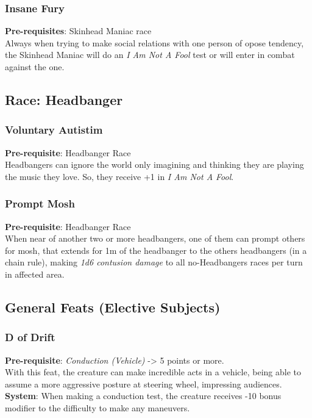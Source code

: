 \documentclass[ letterpaper,12pt]{article}
\begin{document}
\subsubsection{Insane Fury}
 {\bf Pre-requisites}: Skinhead Maniac race\\
 Always when trying to make social relations with one person of opose tendency, the Skinhead Maniac will do an {\it I Am Not A Fool} test or will enter in combat against the one.

\subsection{Race: Headbanger}

\subsubsection{Voluntary Autistim}
{\bf Pre-requisite}: Headbanger Race\\
Headbangers can ignore the world only imagining and thinking they are playing the music they love. So, they receive +1 in {\it I Am Not A Fool}.\\

\subsubsection{Prompt Mosh}
 {\bf Pre-requisite}: Headbanger Race\\
 When near of another two or more headbangers, one of them can prompt others for mosh, that extends for 1m of the headbanger to the others headbangers (in a chain rule), making {\it 1d6 contusion damage} to all no-Headbangers races per turn in affected area.

\subsection{General Feats (Elective Subjects)}

\subsubsection{D of Drift}
{\bf Pre-requisite}: {\it Conduction (Vehicle)} -> 5 points or more.\\
With this feat, the creature can make incredible acts in a vehicle, being able to assume a more aggressive posture at steering wheel, impressing audiences.\\
{\bf System}: When making a conduction test, the creature receives -10 bonus modifier to the difficulty to make any maneuvers.
\end{document}
